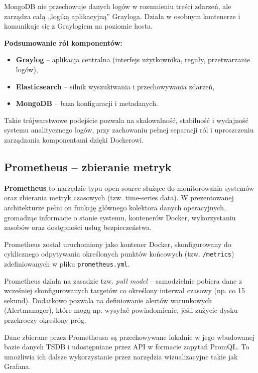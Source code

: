 \documentclass[
    left=2.5cm,         %
    right=2.5cm,        %
    top=2.5cm,          %
    bottom=3cm,         %
    bindingoffset=6mm,  %
    nohyphenation=true %
]{eiti/eiti-thesis} %
\begin{document}
MongoDB nie przechowuje danych logów w rozumieniu treści zdarzeń, ale zarządza całą „logiką aplikacyjną” Grayloga. Działa w osobnym kontenerze i komunikuje się z Graylogiem na poziomie hosta.

\textbf{Podsumowanie ról komponentów:}
\begin{itemize}
    \item \textbf{Graylog} – aplikacja centralna (interfejs użytkownika, reguły, przetwarzanie logów),
    \item \textbf{Elasticsearch} – silnik wyszukiwania i przechowywania zdarzeń,
    \item \textbf{MongoDB} – baza konfiguracji i metadanych.
\end{itemize}

Takie trójwarstwowe podejście pozwala na skalowalność, stabilność i wydajność systemu analitycznego logów, przy zachowaniu pełnej separacji ról i uproszczeniu zarządzania komponentami dzięki Dockerowi.

\subsection{Prometheus – zbieranie metryk}

\textbf{Prometheus}\cite{prometheus-docs} to narzędzie typu open-source służące do monitorowania systemów oraz zbierania metryk czasowych (tzw. time-series data). W prezentowanej architekturze pełni on funkcję głównego kolektora danych operacyjnych, gromadząc informacje o stanie systemu, kontenerów Docker, wykorzystaniu zasobów oraz dostępności usług bezpieczeństwa.

Prometheus został uruchomiony jako kontener Docker, skonfigurowany do cyklicznego odpytywania określonych punktów końcowych (tzw. \texttt{/metrics}) zdefiniowanych w pliku \texttt{prometheus.yml}\cite{config-prometheus}. 

Prometheus działa na zasadzie tzw. \textit{pull model} – samodzielnie pobiera dane z wcześniej skonfigurowanych targetów co określony interwał czasowy (np. co 15 sekund). Dodatkowo pozwala na definiowanie alertów warunkowych (Alertmanager), które mogą np. wysyłać powiadomienie, jeśli zużycie dysku przekroczy określony próg.

Dane zbierane przez Prometheusa są przechowywane lokalnie w jego wbudowanej bazie danych TSDB\cite{prometheus_storage} i udostępniane przez API w formacie zapytań PromQL\cite{prometheus_querying}. To umożliwia ich dalsze wykorzystanie przez narzędzia wizualizacyjne takie jak Grafana.
\end{document}

